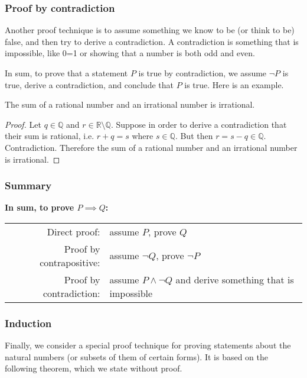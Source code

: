\documentclass{article}
\begin{document}
\subsubsection{Proof by contradiction}

Another proof technique is to assume something we know to be (or think to be) false, and then try to derive a contradiction. A contradiction is something that is impossible, like 0=1 or showing that a number is both odd and even. 

In sum, to prove that a statement $P$ is true by contradiction, we assume $\neg P$ is true, derive a contradiction, and conclude that $P$ is true. Here is an example.

\begin{example}
The sum of a rational number and an irrational number is irrational.
\end{example}

\begin{proof}
Let $q \in \mathbb{Q}$ and $r \in \mathbb{R} \setminus \mathbb{Q}$.
Suppose in order to derive a contradiction that their sum is rational, i.e. $ r + q = s$ where $s \in \mathbb{Q}$.
But then $r = s - q \in \mathbb{Q}$. Contradiction. Therefore the sum of a rational number and an irrational number is irrational.
\end{proof}


\subsubsection{Summary}

{\bf In sum, to prove $P \implies Q$:} 

\begin{tabular}{r l}
     Direct proof:  & assume $P$, prove $Q$ \\
     Proof by contrapositive:  & assume $\neg Q$, prove $\neg P$ \\ 
     Proof by contradiction: & assume $P \wedge \neg Q$ and derive something that is impossible \\ 
\end{tabular}

\vspace{0.5em}

\subsubsection{Induction}

Finally, we consider a special proof technique for proving statements about the natural numbers (or subsets of them of certain forms). It is based on the following theorem, which we state without proof. 
\end{document}
